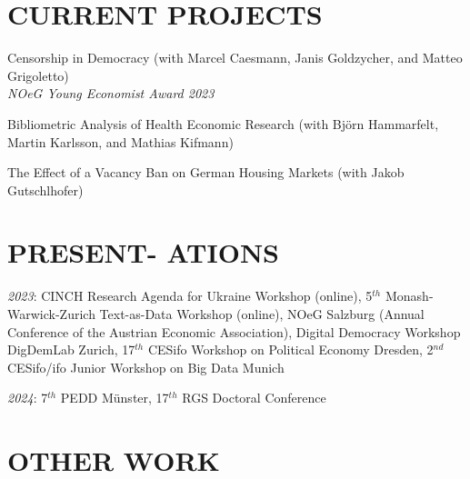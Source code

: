 \documentclass[margin, 12pt]{res} %
\begin{document}
\begin{resume}
		\section{CURRENT PROJECTS}
		
		Censorship in Democracy (with Marcel Caesmann, Janis Goldzycher, and Matteo Grigoletto) \\
		{\sl NOeG Young Economist Award 2023}
		
		Bibliometric Analysis of Health Economic Research (with Björn Hammarfelt, Martin Karlsson, and Mathias Kifmann)
		
		The Effect of a Vacancy Ban on German Housing Markets (with Jakob Gutschlhofer)
		
		
		
		\section{PRESENT- ATIONS}
		{\sl2023}: CINCH Research Agenda for Ukraine Workshop (online), 5$^{th}$ Monash-Warwick-Zurich Text-as-Data Workshop (online), NOeG Salzburg (Annual Conference of the Austrian Economic Association), Digital Democracy Workshop DigDemLab Zurich, 17$^{th}$ CESifo Workshop on Political Economy Dresden, 2$^{nd}$ CESifo/ifo Junior Workshop on Big Data Munich
		
		{\sl2024}: 7$^{th}$ PEDD Münster, 17$^{th}$ RGS Doctoral Conference
		
		\section{OTHER WORK}
		
		

\end{resume}
\end{document}
